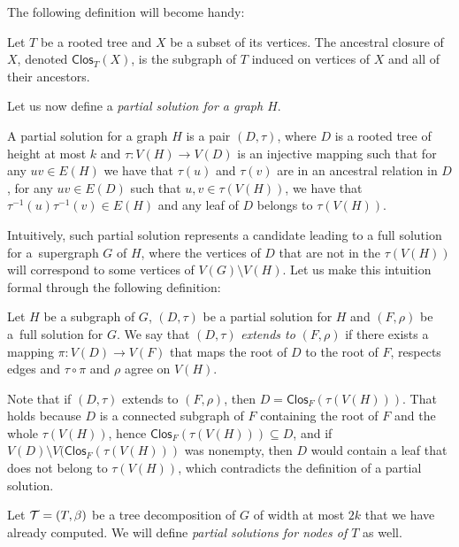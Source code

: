 \documentclass[a4paper,11pt]{article}
\begin{document}
The following definition will become handy:
\begin{definition} \label{def:closure}
Let $T$ be a rooted tree and $X$ be a subset of its vertices. The ancestral closure of~$X$, denoted $\mathsf{Clos}_T(X)$, is the subgraph of $T$ induced on vertices of $X$ and all of their ancestors.
\end{definition}

Let us now define a \emph{partial solution for a graph $H$}.
%
\begin{definition} \label{def:partial-graph}
    A partial solution for a graph $H$ is a pair $(D, \tau)$, where $D$ is a rooted tree of height at most $k$ and $\tau : V(H) \to V(D)$ is an injective mapping such that for any $uv \in E(H)$ we have that $\tau(u)$ and $\tau(v)$ are in an ancestral relation in $D$, for any $uv \in E(D)$ such that $u, v \in \tau(V(H))$, we have that $\tau^{-1}(u)\tau^{-1}(v) \in E(H)$ and any leaf of $D$ belongs to $\tau(V(H))$.
\end{definition}

Intuitively, such partial solution represents a candidate leading to a full solution for a~supergraph $G$ of $H$, where the vertices of $D$ that are not in the $\tau(V(H))$ will correspond to some vertices of $V(G) \setminus V(H)$. Let us make this intuition formal through the following definition:

\begin{definition} \label{def:partial-full-extension}
Let $H$ be a subgraph of $G$, $(D, \tau)$ be a partial solution for $H$ and $(F, \rho)$ be a~full solution for $G$. We say that $(D, \tau)$ \emph{extends to} $(F, \rho)$ if there exists a mapping $\pi : V(D) \to V(F)$ that maps the root of $D$ to the root of $F$, respects edges and $\tau \circ \pi$ and $\rho$ agree on $V(H)$.
\end{definition}

Note that if $(D, \tau)$ extends to $(F, \rho)$, then $D = \mathsf{Clos}_F(\tau(V(H)))$. That holds because $D$ is a connected subgraph of $F$ containing the root of $F$ and the whole $\tau(V(H))$, hence $\mathsf{Clos}_F(\tau(V(H))) \subseteq D$, and if $V(D) \setminus V(\mathsf{Clos}_F(\tau(V(H)))$ was nonempty, then $D$ would contain a leaf that does not belong to $\tau(V(H))$, which contradicts the definition of a partial solution.

Let ${\mathcal{T}} = (T, \beta)$ be a tree decomposition of $G$ of width at most $2k$ that we have already computed. We will define \emph{partial solutions for nodes of $T$} as well.
\end{document}
